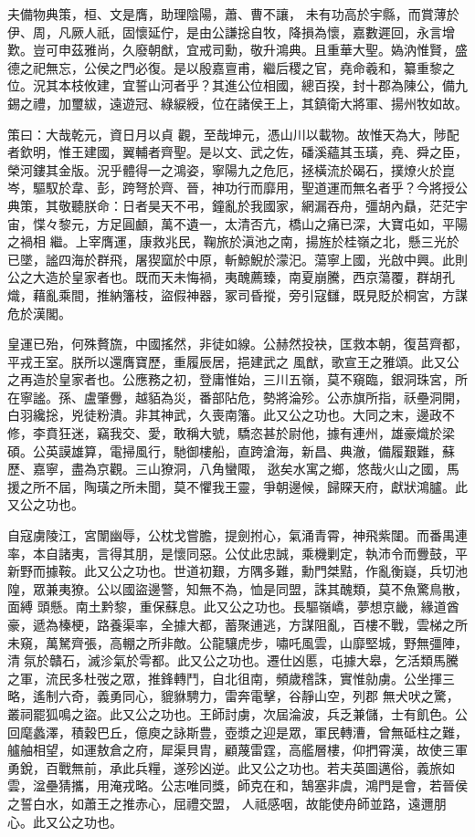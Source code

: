 \begin{pinyinscope}
 夫備物典策，桓、文是膺，助理陰陽，蕭、曹不讓，
 未有功高於宇縣，而賞薄於伊、周，凡厥人祇，固懷延佇，是由公謙捴自牧，降損為懷，嘉數遲回，永言增歎。豈可申茲雅尚，久廢朝猷，宜戒司勳，敬升鴻典。且重華大聖。媯汭惟賢，盛德之祀無忘，公侯之門必復。是以殷嘉亶甫，繼后稷之官，堯命羲和，纂重黎之位。況其本枝攸建，宜誓山河者乎？其進公位相國，總百揆，封十郡為陳公，備九錫之禮，加璽紱，遠遊冠、綠綟綬，位在諸侯王上，其鎮衛大將軍、揚州牧如故。



 策曰：大哉乾元，資日月以貞
 觀，至哉坤元，憑山川以載物。故惟天為大，陟配者欽明，惟王建國，翼輔者齊聖。是以文、武之佐，磻溪蘊其玉璜，堯、舜之臣，榮河鏤其金版。況乎體得一之鴻姿，寧陽九之危厄，拯橫流於碣石，撲燎火於崑岑，驅馭於韋、彭，跨弩於齊、晉，神功行而靡用，聖道運而無名者乎？今將授公典策，其敬聽朕命：日者昊天不弔，鐘亂於我國家，網漏吞舟，彊胡內贔，茫茫宇宙，惵々黎元，方足圓顱，萬不遺一，太清否亢，橋山之痛已深，大寶屯如，平陽之禍相
 繼。上宰膺運，康救兆民，鞠旅於滇池之南，揚旌於桂嶺之北，懸三光於已墜，謐四海於群飛，屠猰窳於中原，斬鯨鯢於濛汜。蕩寧上國，光啟中興。此則公之大造於皇家者也。既而天未悔禍，夷醜薦臻，南夏崩騰，西京蕩覆，群胡孔熾，藉亂乘間，推納籓枝，盜假神器，冢司昏摐，旁引寇讎，既見貶於桐宮，方謀危於漢閣。



 皇運已殆，何殊贅旒，中國搖然，非徒如線。公赫然投袂，匡救本朝，復莒齊都，平戎王室。朕所以還膺寶歷，重履辰居，挹建武之
 風猷，歌宣王之雅頌。此又公之再造於皇家者也。公應務之初，登庸惟始，三川五嶺，莫不窺臨，銀洞珠宮，所在寧謐。孫、盧肇釁，越貊為災，番部阽危，勢將淪殄。公赤旗所指，祅壘洞開，白羽纔捴，兇徒粉潰。非其神武，久喪南籓。此又公之功也。大同之末，邊政不修，李賁狂迷，竊我交、愛，敢稱大號，驕恣甚於尉他，據有連州，雄豪熾於梁碩。公英謨雄算，電掃風行，馳御樓船，直跨滄海，新昌、典澈，備履艱難，蘇歷、嘉寧，盡為京觀。三山獠洞，八角蠻陬，
 逖矣水寓之鄉，悠哉火山之國，馬援之所不屆，陶璜之所未聞，莫不懼我王靈，爭朝邊候，歸賝天府，獻狀鴻臚。此又公之功也。



 自寇虜陵江，宮闈幽辱，公枕戈嘗膽，提劍拊心，氣涌青霄，神飛紫闥。而番禺連率，本自諸夷，言得其朋，是懷同惡。公仗此忠誠，乘機剿定，執沛令而釁鼓，平新野而據鞍。此又公之功也。世道初艱，方隅多難，勳門桀黠，作亂衡嶷，兵切池隍，眾兼夷獠。公以國盜邊警，知無不為，恤是同盟，誅其醜類，莫不魚驚鳥散，面縛
 頭懸。南土黔黎，重保蘇息。此又公之功也。長驅嶺嶠，夢想京畿，緣道酋豪，遞為榛梗，路養渠率，全據大都，蓄聚逋逃，方謀阻亂，百樓不戰，雲梯之所未窺，萬駑齊張，高輣之所非敵。公龍驤虎步，嘯吒風雲，山靡堅城，野無彊陣，清氛於贛石，滅沴氣於雩都。此又公之功也。遷仕凶慝，屯據大皋，乞活類馬騰之軍，流民多杜弢之眾，推鋒轉鬥，自北徂南，頻歲稽誅，實惟勍虜。公坐揮三略，遙制六奇，義勇同心，貔貅騁力，雷奔電擊，谷靜山空，列郡
 無犬吠之驚，叢祠罷狐鳴之盜。此又公之功也。王師討虜，次屆淪波，兵乏兼儲，士有飢色。公回麾蠡澤，積穀巴丘，億庾之詠斯豊，壺漿之迎是眾，軍民轉漕，曾無砥柱之難，艫舳相望，如運敖倉之府，犀渠貝胄，顧蔑雷霆，高艦層樓，仰捫霄漢，故使三軍勇銳，百戰無前，承此兵糧，遂殄凶逆。此又公之功也。若夫英圖邁俗，義旅如雲，湓壘猜攜，用淹戎略。公志唯同獎，師克在和，鵠塞非虞，鴻門是會，若晉侯之誓白水，如蕭王之推赤心，屈禮交盟，
 人祗感咽，故能使舟師並路，遠邇朋心。此又公之功也。




\end{pinyinscope}
